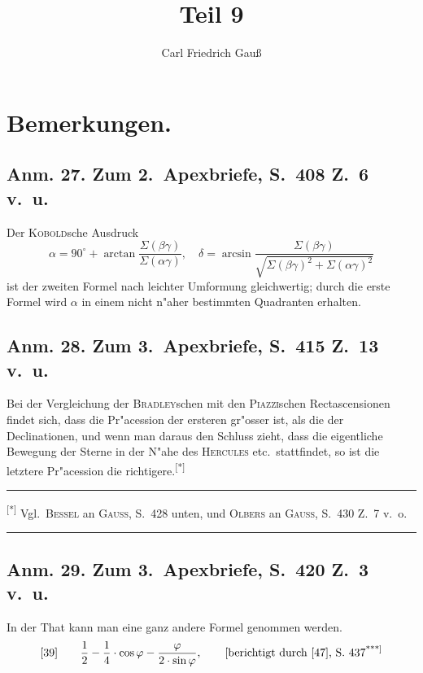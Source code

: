 \documentclass[12pt,a4paper]{article}
\title{Teil 9}
\author{Carl Friedrich Gau\ss}
\date{}
\theoremstyle{plain}
\theoremstyle{definition}
\theoremstyle{remark}
\newcommand{\besc}[1]{\textsc{#1}}
\begin{document}
\maketitle

\section*{Bemerkungen.}

\subsection*{Anm. 27. Zum 2.\ Apexbriefe, S.\ 408 Z.\ 6 v.\ u.}

Der \besc{Kobold}sche Ausdruck
\[
\alpha = 90^{\circ} + \arctan\frac{\Sigma(\beta\gamma)}{\Sigma(\alpha\gamma)},
\quad
\delta = \arcsin\frac{\Sigma(\beta\gamma)}{\sqrt{\Sigma(\beta\gamma)^2 + \Sigma(\alpha\gamma)^2}}
\]
ist der zweiten Formel nach leichter Umformung gleichwertig; durch die erste Formel wird $\alpha$ in einem nicht n"aher bestimmten Quadranten erhalten.


\subsection*{Anm. 28. Zum 3.\ Apexbriefe, S.\ 415 Z.\ 13 v.\ u.}

Bei der Vergleichung der \besc{Bradley}schen mit den \besc{Piazzi}schen Rectascensionen findet sich, dass die Pr"acession der ersteren gr"osser ist, als die der Declinationen, und wenn man daraus den Schluss zieht, dass die eigentliche Bewegung der Sterne in der N"ahe des \besc{Hercules} etc.\ stattfindet, so ist die letztere Pr"acession die richtigere.\textsuperscript{[*]}

\rule{\textwidth}{0.4pt}
{\small
\textsuperscript{[*]} Vgl.\ \besc{Bessel} an \besc{Gauss}, S.\ 428 unten, und \besc{Olbers} an \besc{Gauss}, S.\ 430 Z.\ 7 v.\ o.}

\rule{\textwidth}{0.4pt}


\subsection*{Anm. 29. Zum 3.\ Apexbriefe, S.\ 420 Z.\ 3 v.\ u.}

In der That kann man eine ganz andere Formel genommen werden.
\[
\text{[39]} \qquad \frac{1}{2} - \frac{1}{4}\cdot\cos\varphi - \frac{\varphi}{2\cdot\sin\varphi},
\qquad
\text{[berichtigt durch [47], S.\ 437\textsuperscript{***]}}
\]
\end{document}
